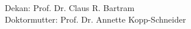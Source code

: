\thispagestyle{empty}
\vspace*{20cm}
Dekan: Prof. Dr. Claus R. Bartram \\
Doktormutter: Prof. Dr. Annette Kopp-Schneider